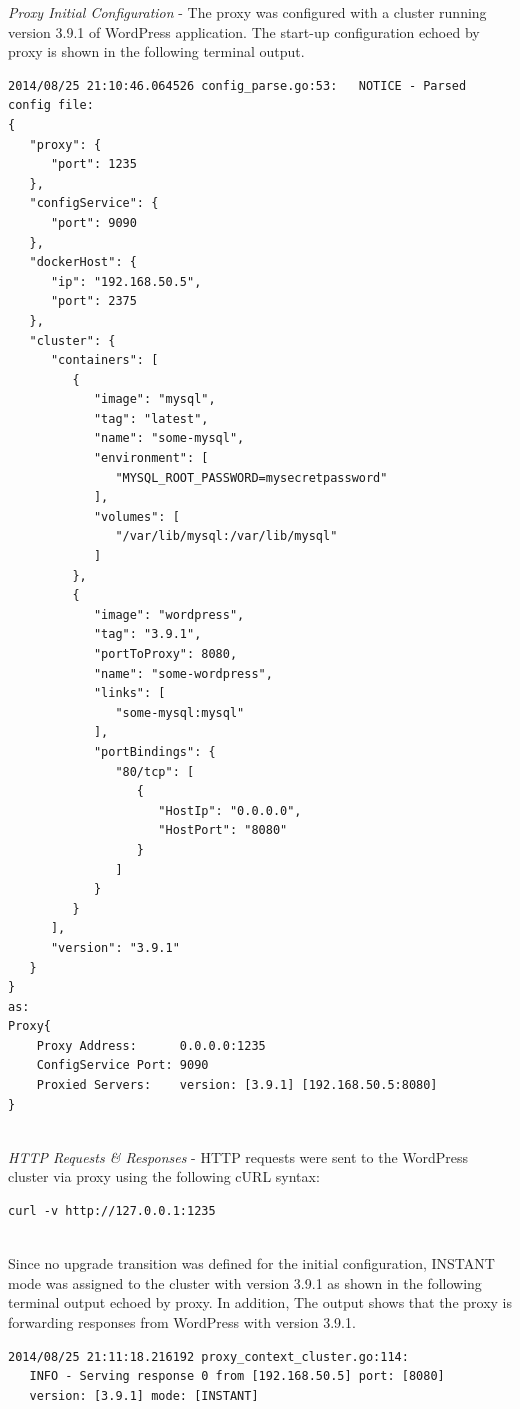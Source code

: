 \documentclass[a4paper,11pt,twoside]{report}
\begin{document}
\noindent
\textit{Proxy Initial Configuration} - The proxy was configured with a cluster running version 3.9.1 of WordPress application. The start-up configuration echoed by proxy is shown in the following terminal output.\smallskip

\begin{lstlisting}[language=terminal]
2014/08/25 21:10:46.064526 config_parse.go:53:   NOTICE - Parsed config file:
{
   "proxy": {
      "port": 1235
   },
   "configService": {
      "port": 9090
   },
   "dockerHost": {
      "ip": "192.168.50.5",
      "port": 2375
   },
   "cluster": {
      "containers": [
         {
            "image": "mysql",
            "tag": "latest",
            "name": "some-mysql",
            "environment": [
               "MYSQL_ROOT_PASSWORD=mysecretpassword"
            ],
            "volumes": [
               "/var/lib/mysql:/var/lib/mysql"
            ]
         },
         {
            "image": "wordpress",
            "tag": "3.9.1",
            "portToProxy": 8080,
            "name": "some-wordpress",
            "links": [
               "some-mysql:mysql"
            ],
            "portBindings": {
               "80/tcp": [
                  {
                     "HostIp": "0.0.0.0",
                     "HostPort": "8080"
                  }
               ]
            }
         }
      ],
      "version": "3.9.1"
   }
}
as:
Proxy{
	Proxy Address:      0.0.0.0:1235
	ConfigService Port: 9090
	Proxied Servers:    version: [3.9.1] [192.168.50.5:8080]
}
\end{lstlisting}

\noindent \\
\textit{HTTP Requests \& Responses} - HTTP requests were sent to the WordPress cluster via proxy using the following cURL syntax:\smallskip  

\begin{lstlisting}[language=terminal]
curl -v http://127.0.0.1:1235
\end{lstlisting} 

\noindent\\Since no upgrade transition was defined for the initial configuration, INSTANT mode was assigned to the cluster with version 3.9.1 as shown in the following terminal output echoed by proxy. In addition, The output shows that the proxy is forwarding responses from WordPress with version 3.9.1. \smallskip

\begin{lstlisting}[language=terminal] 
2014/08/25 21:11:18.216192 proxy_context_cluster.go:114:     
   INFO - Serving response 0 from [192.168.50.5] port: [8080] 
   version: [3.9.1] mode: [INSTANT]
\end{lstlisting} 
\end{document}
